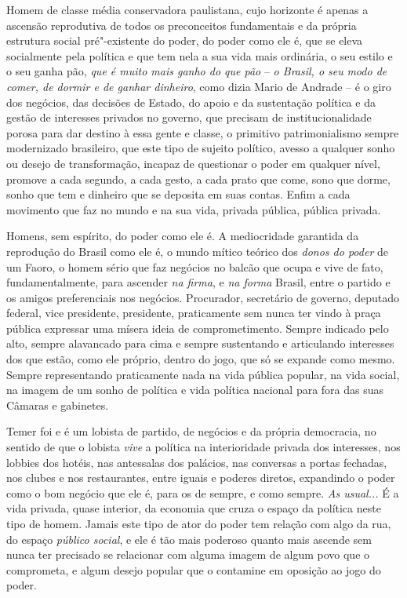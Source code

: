 Homem de classe média conservadora paulistana, cujo horizonte é
apenas a ascensão reprodutiva de todos os preconceitos fundamentais e da
própria estrutura social pré"-existente do poder, do poder como ele é,
que se eleva socialmente pela política e que tem nela a sua vida mais
ordinária, o seu estilo e o seu ganha pão, \emph{que é muito mais ganho
do que pão} -- \emph{o Brasil, o seu} \emph{modo de comer, de dormir e
de ganhar dinheiro}, como dizia Mario de Andrade -- é o giro dos
negócios, das decisões de Estado, do apoio e da sustentação política e
da gestão de interesses privados no governo, que precisam de
institucionalidade porosa para dar destino à essa gente e classe, o
primitivo patrimonialismo sempre modernizado brasileiro, que este tipo
de sujeito político, avesso a qualquer sonho ou desejo de transformação,
incapaz de questionar o poder em qualquer nível, promove a cada segundo,
a cada gesto, a cada prato que come, sono que dorme,
sonho que tem e dinheiro que se deposita em suas contas. Enfim a cada
movimento que faz no mundo e na sua vida, privada pública, pública
privada.

Homens, sem espírito, do poder como ele é. A mediocridade garantida da
reprodução do Brasil como ele é, o mundo mítico teórico dos \emph{donos
do poder} de um Faoro, o homem sério que faz negócios no balcão que ocupa e vive de
fato, fundamentalmente, para ascender \emph{na firma}, e
\emph{na forma} Brasil, entre o partido e
os amigos preferenciais nos negócios. Procurador, secretário de governo,
deputado federal, vice presidente, presidente, praticamente sem nunca
ter vindo à praça pública expressar uma mísera ideia de comprometimento.
Sempre indicado pelo alto, sempre alavancado para cima e sempre
sustentando e articulando interesses dos que estão, como ele próprio,
dentro do jogo, que só se expande como mesmo. Sempre representando
praticamente nada na vida pública popular, na vida social, na imagem de
um sonho de política e vida política nacional para fora das suas Câmaras
e gabinetes.

Temer foi e é um lobista de partido, de negócios e da própria democracia,
no sentido de que o lobista \emph{vive} a política na interioridade
privada dos interesses, nos lobbies dos hotéis, nas antessalas dos
palácios, nas conversas a portas fechadas, nos clubes e nos
restaurantes, entre iguais e poderes diretos, expandindo o poder como o
bom negócio que ele é, para os de sempre, e como sempre. \emph{As
usual...} É a vida privada, quase interior, da economia que cruza o
espaço da política neste tipo de homem. Jamais este tipo de ator do
poder tem relação com algo da rua, do espaço \emph{público social}, e
ele é tão mais poderoso quanto mais ascende sem nunca ter precisado se
relacionar com alguma imagem de algum povo que o comprometa, e
algum desejo popular que o contamine em oposição ao jogo do poder.

